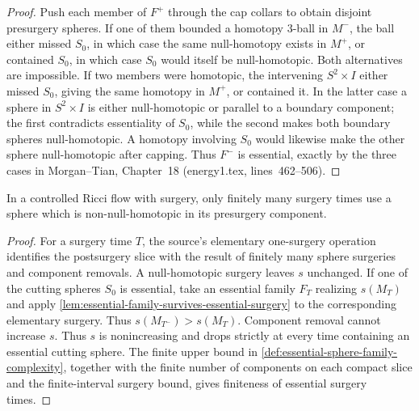 \begin{proof}
Push each member of $F^+$ through the cap collars to obtain disjoint
presurgery spheres.  If one of them bounded a homotopy $3$-ball in $M^-$,
the ball either missed $S_0$, in which case the same null-homotopy exists
in $M^+$, or contained $S_0$, in which case $S_0$ would itself be
null-homotopic.  Both alternatives are impossible.  If two members were
homotopic, the intervening $S^2\times I$ either missed $S_0$, giving the
same homotopy in $M^+$, or contained it.  In the latter case a sphere in
$S^2\times I$ is either null-homotopic or parallel to a boundary
component; the first contradicts essentiality of $S_0$, while the second
makes both boundary spheres null-homotopic.  A homotopy involving $S_0$
would likewise make the other sphere null-homotopic after capping.  Thus
$F^-$ is essential, exactly by the three cases in Morgan--Tian,
Chapter~18 (energy1.tex, lines~462--506).
\end{proof}

\begin{theorem}
\label{thm:finite-essential-sphere-surgeries}
\notready
In a controlled Ricci flow with surgery, only finitely many
surgery times use a sphere which is non-null-homotopic in its presurgery
component.
\end{theorem}

\begin{proof}
For a surgery time $T$, the source's elementary one-surgery operation
identifies the postsurgery slice with the result of finitely many sphere
surgeries and component removals.  A
null-homotopic surgery leaves $s$ unchanged.  If one of the cutting spheres
$S_0$ is essential, take an essential family $F_T$ realizing $s(M_T)$ and
apply \ref{lem:essential-family-survives-essential-surgery} to the
corresponding elementary surgery.  Thus $s(M_{T^-})>s(M_T)$.  Component
removal cannot increase
$s$.  Thus $s$ is nonincreasing and drops strictly at every time containing
an essential cutting sphere.  The finite upper bound in
\ref{def:essential-sphere-family-complexity}, together with the finite number
of components on each compact slice and the finite-interval surgery bound,
gives finiteness of essential surgery times.
\end{proof}

